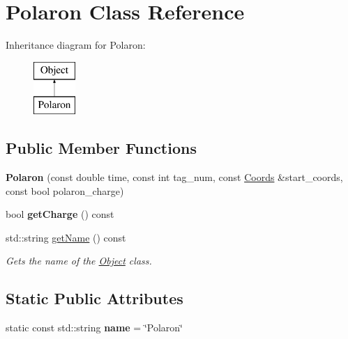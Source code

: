\hypertarget{class_polaron}{}\section{Polaron Class Reference}
\label{class_polaron}
Inheritance diagram for Polaron\+:\begin{figure}[H]
\begin{center}
\leavevmode
\includegraphics[height=2.000000cm]{class_polaron}
\end{center}
\end{figure}
\subsection*{Public Member Functions}
\begin{DoxyCompactItemize}
\item 
\mbox{\label{class_polaron_a7392b742eec8c5bf4438198901c570a9}} 
{\bfseries Polaron} (const double time, const int tag\+\_\+num, const \hyperlink{struct_coords}{Coords} \&start\+\_\+coords, const bool polaron\+\_\+charge)
\item 
\mbox{\label{class_polaron_a41c1a9b0b23a35e6ff765c8168a9fb6f}} 
bool {\bfseries get\+Charge} () const
\item 
std\+::string \hyperlink{class_polaron_ab30575f6248183c9dab4d257df2f91fc}{get\+Name} () const
\begin{DoxyCompactList}\small\item\em Gets the name of the \hyperlink{class_object}{Object} class. \end{DoxyCompactList}\end{DoxyCompactItemize}
\subsection*{Static Public Attributes}
\begin{DoxyCompactItemize}
\item 
\mbox{\label{class_polaron_aee580c6a3921395abe02c3be1b55339a}} 
static const std\+::string {\bfseries name} = \char`\"{}Polaron\char`\"{}
\end{DoxyCompactItemize}


